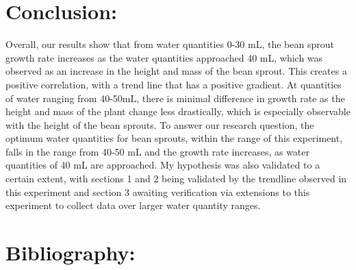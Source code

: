 \documentclass[11pt, a4]{article}
\begin{document}
	\section{Conclusion:}
		Overall, our results show that from water quantities 0-30 mL, the bean sprout growth rate increases as the water quantities approached 40 mL, which was observed as an increase in the height and mass of the bean sprout. This creates a positive correlation, with a trend line that has a positive gradient. At quantities of water ranging from 40-50mL, there is minimal difference in growth rate as the height and mass of the plant change less drastically, which is especially observable with the height of the bean sprouts. To answer our research question, the optimum water quantities for bean sprouts, within the range of this experiment, falls in the range from 40-50 mL and the growth rate increases, as water quantities of 40 mL are approached. My hypothesis was also validated to a certain extent, with sections 1 and 2 being validated by the trendline observed in this experiment and section 3 awaiting verification via extensions to this experiment to collect data over larger water quantity ranges.
	\section{Bibliography:}
\end{document}
